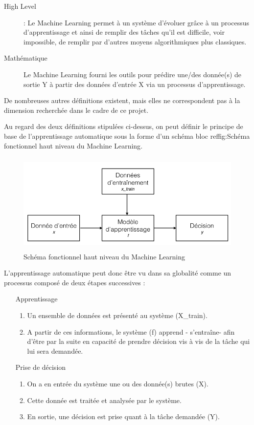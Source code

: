 \begin{description}
	\item[High Level]: Le Machine Learning permet à un système d'évoluer grâce à un processus d'apprentissage et ainsi de remplir des tâches qu'il est difficile, voir impossible, de remplir par d'autres moyens algorithmiques plus classiques. 
	\item[Mathématique] Le Machine Learning fourni les outils pour prédire une/des donnée(s) de sortie Y à partir des données d'entrée X via un processus d'apprentissage. 
\end{description}
 
 De nombreuses autres définitions existent, mais elles ne correspondent pas à la dimension recherchée dans le cadre de ce projet.
 
Au regard des deux définitions stipulées ci-dessus, on peut définir le principe de base de l'apprentissage automatique sous la forme d'un schéma bloc 	ref{fig:Schéma fonctionnel haut niveau du Machine Learning}.

\begin{figure}[h]
	\centering\includegraphics[height=5cm]{images/ML_high_level.jpeg}
	\caption{Schéma fonctionnel haut niveau du Machine Learning}
	\label{fig:Schéma fonctionnel haut niveau du Machine Learning}
\end{figure}

L'apprentissage automatique peut donc être vu dans sa globalité comme un processus composé de deux étapes successives : 
\begin{enumerate}
		\item [Apprentissage]
		 \begin{enumerate}
			\item  Un ensemble de données est présenté au système (X\_train).
			\item A partir de ces informations, le système (f) apprend - s'entraîne- afin d'être par la suite en capacité de prendre décision vis à vis de la tâche qui lui sera demandée. 
		\end{enumerate}
		
		\item [Prise de décision] 
		\begin{enumerate}
			\item  On a en entrée du système une ou des donnée(s) brutes (X).  
			\item Cette donnée est traitée et analysée par le système.
			\item En sortie, une décision est prise quant à la tâche demandée (Y). 
		\end{enumerate}
\end{enumerate}

